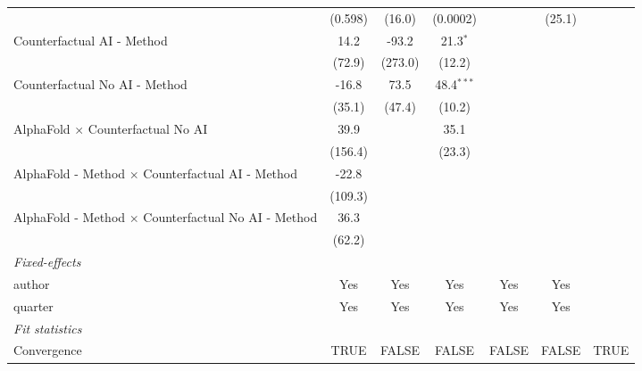 \begin{tabular}{lcccccc}
                                                              & (0.598)  & (16.0)        & (0.0002)     &         & (25.1)       &   \\   
   Counterfactual AI - Method                                 & 14.2     & -93.2         & 21.3$^{*}$   &         &              &   \\   
                                                              & (72.9)   & (273.0)       & (12.2)       &         &              &   \\   
   Counterfactual No AI - Method                              & -16.8    & 73.5          & 48.4$^{***}$ &         &              &   \\   
                                                              & (35.1)   & (47.4)        & (10.2)       &         &              &   \\   
   AlphaFold $\times$ Counterfactual No AI                    & 39.9     &               & 35.1         &         &              &   \\   
                                                              & (156.4)  &               & (23.3)       &         &              &   \\   
   AlphaFold - Method $\times$ Counterfactual AI - Method     & -22.8    &               &              &         &              &   \\   
                                                              & (109.3)  &               &              &         &              &   \\   
   AlphaFold - Method $\times$ Counterfactual No AI - Method  & 36.3     &               &              &         &              &   \\   
                                                              & (62.2)   &               &              &         &              &   \\   
   \midrule
   \emph{Fixed-effects}\\
   author                                                     & Yes      & Yes           & Yes          & Yes     & Yes          & \\  
   quarter                                                    & Yes      & Yes           & Yes          & Yes     & Yes          & \\  
   \midrule
   \emph{Fit statistics}\\
   Convergence                                                &TRUE      & FALSE         & FALSE        & FALSE   & FALSE        & TRUE\\  

\end{tabular}
